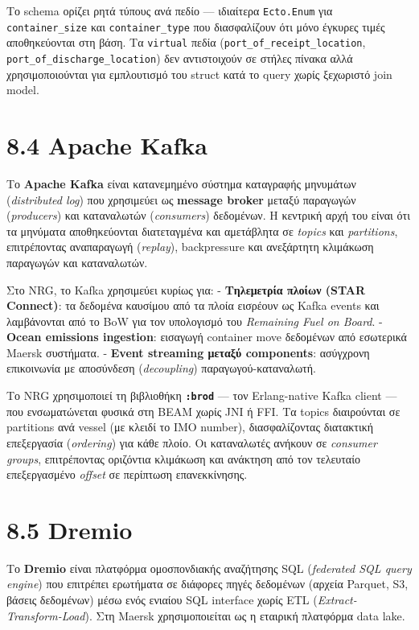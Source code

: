 Το schema ορίζει ρητά τύπους ανά πεδίο --- ιδιαίτερα \texttt{Ecto.Enum}
για \texttt{container\_size} και \texttt{container\_type} που
διασφαλίζουν ότι μόνο έγκυρες τιμές αποθηκεύονται στη βάση. Τα
\texttt{virtual} πεδία (\texttt{port\_of\_receipt\_location},
\texttt{port\_of\_discharge\_location}) δεν αντιστοιχούν σε στήλες
πίνακα αλλά χρησιμοποιούνται για εμπλουτισμό του struct κατά το query
χωρίς ξεχωριστό join model.

\section{8.4 Apache Kafka}\label{apache-kafka}

Το \textbf{Apache Kafka} είναι κατανεμημένο σύστημα καταγραφής μηνυμάτων
(\emph{distributed log}) που χρησιμεύει ως \textbf{message broker}
μεταξύ παραγωγών (\emph{producers}) και καταναλωτών (\emph{consumers})
δεδομένων. Η κεντρική αρχή του είναι ότι τα μηνύματα αποθηκεύονται
διατεταγμένα και αμετάβλητα σε \emph{topics} και \emph{partitions},
επιτρέποντας αναπαραγωγή (\emph{replay}), backpressure και ανεξάρτητη
κλιμάκωση παραγωγών και καταναλωτών.

Στο NRG, το Kafka χρησιμεύει κυρίως για: - \textbf{Τηλεμετρία πλοίων
(STAR Connect)}: τα δεδομένα καυσίμου από τα πλοία εισρέουν ως Kafka
events και λαμβάνονται από το BoW για τον υπολογισμό του \emph{Remaining
Fuel on Board}. - \textbf{Ocean emissions ingestion}: εισαγωγή container
move δεδομένων από εσωτερικά Maersk συστήματα. - \textbf{Event streaming
μεταξύ components}: ασύγχρονη επικοινωνία με αποσύνδεση
(\emph{decoupling}) παραγωγού-καταναλωτή.

Το NRG χρησιμοποιεί τη βιβλιοθήκη \textbf{\texttt{:brod}} --- τον
Erlang-native Kafka client --- που ενσωματώνεται φυσικά στη BEAM χωρίς
JNI ή FFI. Τα topics διαιρούνται σε partitions ανά vessel (με κλειδί το
IMO number), διασφαλίζοντας διατακτική επεξεργασία (\emph{ordering}) για
κάθε πλοίο. Οι καταναλωτές ανήκουν σε \emph{consumer groups},
επιτρέποντας οριζόντια κλιμάκωση και ανάκτηση από τον τελευταίο
επεξεργασμένο \emph{offset} σε περίπτωση επανεκκίνησης.

\section{8.5 Dremio}\label{dremio}

Το \textbf{Dremio} είναι πλατφόρμα ομοσπονδιακής αναζήτησης SQL
(\emph{federated SQL query engine}) που επιτρέπει ερωτήματα σε διάφορες
πηγές δεδομένων (αρχεία Parquet, S3, βάσεις δεδομένων) μέσω ενός ενιαίου
SQL interface χωρίς ETL (\emph{Extract-Transform-Load}). Στη Maersk
χρησιμοποιείται ως η εταιρική πλατφόρμα data lake.

